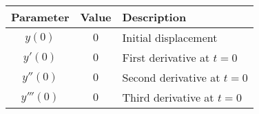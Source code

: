 
\begin{tabular}{|c|c|l|}
\hline
Parameter  & Value & Description   \\             
\hline
$y(0)$     & $0$   & Initial displacement  \\     
 \hline
$y'(0)$    & $0$   & First derivative at $t=0$  \\
 \hline
$y''(0)$   & $0$   & Second derivative at $t=0$ \\
 \hline
$y'''(0)$  & $0$   & Third derivative at $t=0$  \\
 \hline
\end{tabular}

